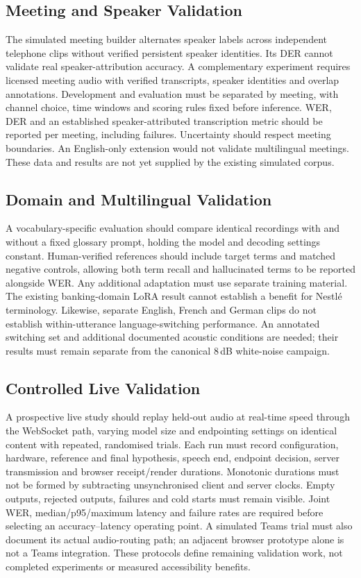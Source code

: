 \subsection*{Meeting and Speaker Validation}
The simulated meeting builder alternates speaker labels across independent
telephone clips without verified persistent speaker identities. Its DER cannot
validate real speaker-attribution accuracy. A complementary experiment requires
licensed meeting audio with verified transcripts, speaker identities and overlap
annotations. Development and evaluation must be separated by meeting, with
channel choice, time windows and scoring rules fixed before inference. WER,
DER and an established speaker-attributed transcription metric should be
reported per meeting, including failures. Uncertainty should respect meeting
boundaries. An English-only extension would not validate multilingual meetings.
These data and results are not yet supplied by the existing simulated corpus.

\subsection*{Domain and Multilingual Validation}
A vocabulary-specific evaluation should compare identical recordings with and
without a fixed glossary prompt, holding the model and decoding settings
constant. Human-verified references should include target terms and matched
negative controls, allowing both term recall and hallucinated terms to be
reported alongside WER. Any additional adaptation must use separate training
material. The existing banking-domain LoRA result cannot establish a benefit
for Nestl\'e terminology. Likewise, separate English, French and German clips
do not establish within-utterance language-switching performance. An annotated
switching set and additional documented acoustic conditions are needed; their
results must remain separate from the canonical 8\,dB white-noise campaign.

\subsection*{Controlled Live Validation}
A prospective live study should replay held-out audio at real-time speed through
the WebSocket path, varying model size and endpointing settings on identical
content with repeated, randomised trials. Each run must record configuration,
hardware, reference and final hypothesis, speech end, endpoint decision,
server transmission and browser receipt/render durations. Monotonic durations
must not be formed by subtracting unsynchronised client and server clocks.
Empty outputs, rejected outputs, failures and cold starts must remain visible.
Joint WER, median/p95/maximum latency and failure rates are required before
selecting an accuracy--latency operating point. A simulated Teams trial must
also document its actual audio-routing path; an adjacent browser prototype
alone is not a Teams integration. These protocols define remaining validation
work, not completed experiments or measured accessibility benefits.
